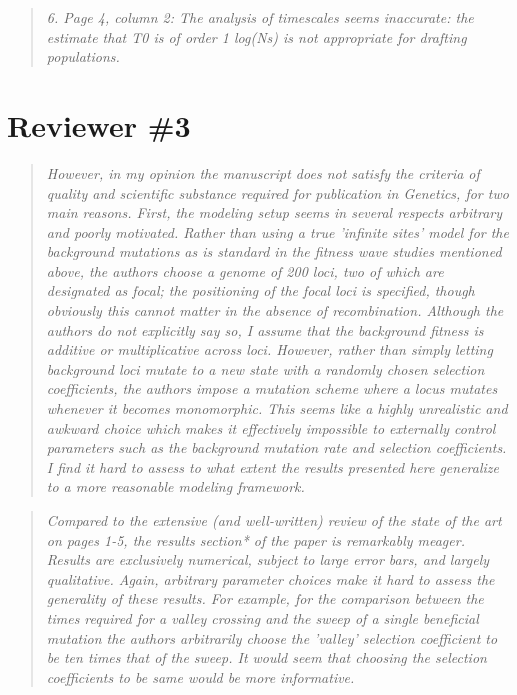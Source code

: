 \documentclass[11pt]{article}
\newenvironment{reviewerquote}{\begin{quote}\color{black}\itshape}{\end{quote}}
\begin{document}
\begin{reviewerquote}
6. Page 4, column 2: The analysis of timescales seems inaccurate: the estimate that T0 is of order 1 log(Ns) is not appropriate for drafting populations.
\end{reviewerquote}


\section*{Reviewer \#3}

\begin{reviewerquote}
However, in my opinion the manuscript does not satisfy the criteria of quality and scientific substance required for publication in Genetics, for two main reasons. First, the modeling setup seems in several respects arbitrary and poorly motivated. Rather than using a true 'infinite sites' model for the background mutations as is standard in the fitness wave studies mentioned above, the authors choose a genome of 200 loci, two of which are designated as focal; the positioning of the focal loci is specified, though obviously this cannot matter in the absence of recombination. Although the authors do not explicitly say so, I assume that the background fitness is additive or multiplicative across loci. However, rather than simply letting background loci mutate to a new state with a randomly chosen selection coefficients, the authors impose a mutation scheme where a locus mutates whenever it becomes monomorphic. This seems like a highly unrealistic and awkward choice which makes it effectively impossible to externally control parameters such as the background mutation rate and selection coefficients. I find it hard to assess to what extent the results presented here generalize to a more reasonable modeling framework. 
\end{reviewerquote}


\begin{reviewerquote}
Compared to the extensive (and well-written) review of the state of the art on pages 1-5, the results section* of the paper is remarkably meager. Results are exclusively numerical, subject to large error bars, and largely qualitative. Again, arbitrary parameter choices make it hard to assess the generality of these results. For example, for the comparison between the times required for a valley 
crossing and the sweep of a single beneficial mutation the authors arbitrarily choose the 'valley' selection coefficient to be ten times that of the sweep. It would seem that choosing the selection coefficients to be same would be more informative.
\end{reviewerquote}
\end{document}
